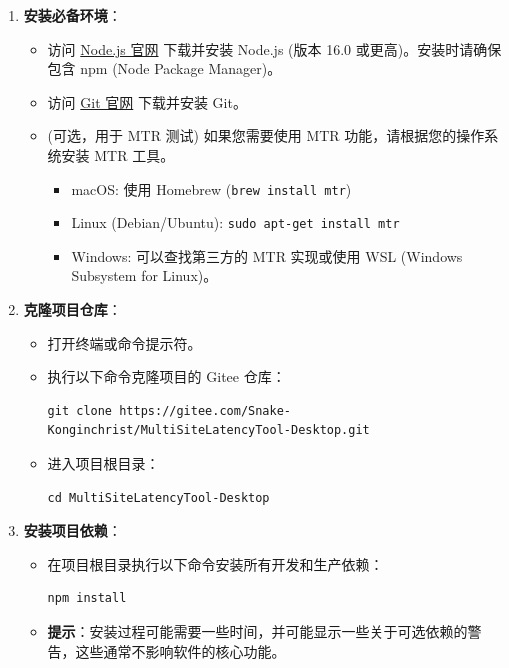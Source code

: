 \documentclass{article}
\begin{document}
\begin{enumerate}[label=\arabic*.]
    \item \textbf{安装必备环境}：
    \begin{itemize}
        \item 访问 \href{https://nodejs.org/}{Node.js 官网} 下载并安装 Node.js (版本 16.0 或更高)。安装时请确保包含 npm (Node Package Manager)。
        \item 访问 \href{https://git-scm.com/}{Git 官网} 下载并安装 Git。
        \item (可选，用于 MTR 测试) 如果您需要使用 MTR 功能，请根据您的操作系统安装 MTR 工具。
        \begin{itemize}
            \item macOS: 使用 Homebrew (\texttt{brew install mtr})
            \item Linux (Debian/Ubuntu): \texttt{sudo apt-get install mtr}
            \item Windows: 可以查找第三方的 MTR 实现或使用 WSL (Windows Subsystem for Linux)。
        \end{itemize}
    \end{itemize}

    \item \textbf{克隆项目仓库}：
    \begin{itemize}
        \item 打开终端或命令提示符。
        \item 执行以下命令克隆项目的 Gitee 仓库：
        \begin{verbatim}
git clone https://gitee.com/Snake-Konginchrist/MultiSiteLatencyTool-Desktop.git
        \end{verbatim}
        \item 进入项目根目录：
        \begin{verbatim}
cd MultiSiteLatencyTool-Desktop
        \end{verbatim}
    \end{itemize}

    \item \textbf{安装项目依赖}：
    \begin{itemize}
        \item 在项目根目录执行以下命令安装所有开发和生产依赖：
        \begin{verbatim}
npm install
        \end{verbatim}
        \item \textbf{提示}：安装过程可能需要一些时间，并可能显示一些关于可选依赖的警告，这些通常不影响软件的核心功能。
    \end{itemize}


\end{enumerate}
\end{document}
